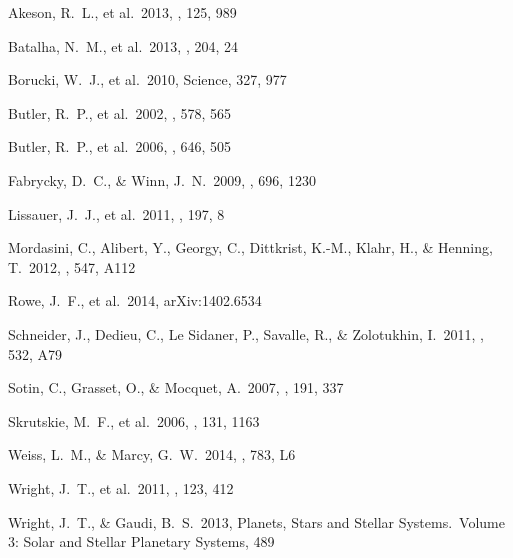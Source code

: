 \begin{thebibliography}

 Akeson, R.~L., et al.\ 2013, 
\pasp, 125, 989 %

 Batalha, N.~M., et al.\ 2013, 
\apjs, 204, 24 %

 Borucki, W.~J., et al.\ 2010, 
Science, 327, 977 %

 Butler, R.~P., et al.\ 2002, 
\apj, 578, 565 %

 Butler, R.~P., et al.\ 2006, 
\apj, 646, 505 %

 Fabrycky, D.~C., \&
  Winn, J.~N.\ 2009, \apj, 696, 1230 %

 Lissauer, J.~J., et al.\ 
2011, \apjs, 197, 8 %

 Mordasini, C., Alibert, Y., 
Georgy, C., Dittkrist, K.-M., Klahr, H., \& Henning, T.\ 2012, \aap, 547, A112

 Rowe, J.~F., et al.\ 2014, 
arXiv:1402.6534 %

 Schneider, J., Dedieu, C., 
Le Sidaner, P., Savalle, R., \& Zolotukhin, I.\ 2011, \aap, 532, A79

 Sotin, C., Grasset, O., 
\& Mocquet, A.\ 2007, \icarus, 191, 337 %

 Skrutskie, M.~F., et al.\ 
2006, \aj, 131, 1163 %

 Weiss, L.~M., \& Marcy,
  G.~W.\ 2014, \apjl, 783, L6  %

\bibitem[Wright et al.(2011)]{Wright2011} Wright, J.~T., et al.\ 2011,
  \pasp, 123, 412 %

 Wright, J.~T., \& Gaudi, B.~S.\ 2013,
  Planets, Stars and Stellar Systems.~Volume 3: Solar and Stellar
  Planetary Systems, 489 %
  
\end{thebibliography}
